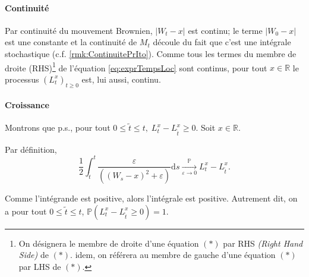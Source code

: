 \documentclass[openany]{book}
\makeatletter
\renewcommand{\P}{\mathds{P}}
\newcommand{\R}{\mathbb{R}}
\newcommand{\1}{\mathbbm{1}}
\newcommand{\sign}{\text{sign}}
\renewcommand{\d}{\mathrm{d}}
\renewenvironment{proof}[1][\textbf{\textit{Démonstration}}]{%
  \par\pushQED{\qed}%
  \normalfont\topsep6\p@\@plus6\p@\relax
  \trivlist\item[\hskip\labelsep
    #1\@addpunct{.}]\ignorespaces
}{%
  \popQED\endtrivlist\@endpefalse
}
\theoremstyle{thmfont}
\theoremstyle{deffont}
\theoremstyle{thmfont}
\theoremstyle{deffont}
\makeatother
\begin{document}
\begin{proof}
\paragraph{Continuité} Par continuité du mouvement Brownien, $|W_t - x|$ est continu; le terme $|W_0 - x|$ est une constante et la continuité de $M_t$ découle du fait que c'est une intégrale stochastique (c.f. \autoref{rmk:ContinuitePrIto}).
Comme tous les termes du membre de droite (RHS)\footnote{On désignera le membre de droite d'une équation $(*)$ par RHS \textit{(Right Hand Side)} de $(*)$. idem, on référera au membre de gauche d'une équation $(*)$ par LHS de $(*)$.} de l'équation \eqref{eq:exprTempsLoc} sont continus, pour tout $x \in \R$ le processus $(L_t^x)_{t\geq0}$ est, lui aussi, continu.

\paragraph{Croissance} Montrons que p.s., pour tout $0 \leq \tilde t \leq t, \; L_t^x - L_{\tilde t}^x \geq 0$. Soit $x \in \R$.

\noindent Par définition, $$\dfrac{1}{2}\int_{\tilde t}^t \dfrac{\varepsilon}{\left((W_s-x)^2 + \varepsilon \right)} \d s \xrightarrow[\varepsilon \to 0]{\P} L_t^x - L_{\tilde t}^x.$$

\noindent Comme l'intégrande est positive, alors l'intégrale est positive. Autrement dit, on a pour tout $0 \leq \tilde t \leq t$, $\P(L_t^x - L_{\tilde t}^x \geq 0) = 1$.\\



\end{proof}
\end{document}
